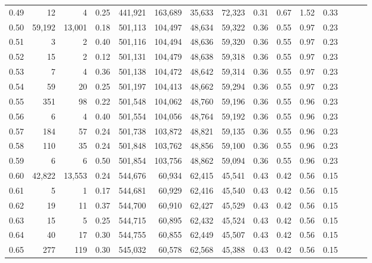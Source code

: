 \begin{tabular}{rrrrrrrrrrrrrrr}
0.49 &      12 &       4 &  0.25 &  441,921 &  163,689 &   35,633 &   72,323 &  0.31 &  0.67 &  1.52 &      0.33 \\
0.50 &  59,192 &  13,001 &  0.18 &  501,113 &  104,497 &   48,634 &   59,322 &  0.36 &  0.55 &  0.97 &      0.23 \\
0.51 &       3 &       2 &  0.40 &  501,116 &  104,494 &   48,636 &   59,320 &  0.36 &  0.55 &  0.97 &      0.23 \\
0.52 &      15 &       2 &  0.12 &  501,131 &  104,479 &   48,638 &   59,318 &  0.36 &  0.55 &  0.97 &      0.23 \\
0.53 &       7 &       4 &  0.36 &  501,138 &  104,472 &   48,642 &   59,314 &  0.36 &  0.55 &  0.97 &      0.23 \\
0.54 &      59 &      20 &  0.25 &  501,197 &  104,413 &   48,662 &   59,294 &  0.36 &  0.55 &  0.97 &      0.23 \\
0.55 &     351 &      98 &  0.22 &  501,548 &  104,062 &   48,760 &   59,196 &  0.36 &  0.55 &  0.96 &      0.23 \\
0.56 &       6 &       4 &  0.40 &  501,554 &  104,056 &   48,764 &   59,192 &  0.36 &  0.55 &  0.96 &      0.23 \\
0.57 &     184 &      57 &  0.24 &  501,738 &  103,872 &   48,821 &   59,135 &  0.36 &  0.55 &  0.96 &      0.23 \\
0.58 &     110 &      35 &  0.24 &  501,848 &  103,762 &   48,856 &   59,100 &  0.36 &  0.55 &  0.96 &      0.23 \\
0.59 &       6 &       6 &  0.50 &  501,854 &  103,756 &   48,862 &   59,094 &  0.36 &  0.55 &  0.96 &      0.23 \\
0.60 &  42,822 &  13,553 &  0.24 &  544,676 &   60,934 &   62,415 &   45,541 &  0.43 &  0.42 &  0.56 &      0.15 \\
0.61 &       5 &       1 &  0.17 &  544,681 &   60,929 &   62,416 &   45,540 &  0.43 &  0.42 &  0.56 &      0.15 \\
0.62 &      19 &      11 &  0.37 &  544,700 &   60,910 &   62,427 &   45,529 &  0.43 &  0.42 &  0.56 &      0.15 \\
0.63 &      15 &       5 &  0.25 &  544,715 &   60,895 &   62,432 &   45,524 &  0.43 &  0.42 &  0.56 &      0.15 \\
0.64 &      40 &      17 &  0.30 &  544,755 &   60,855 &   62,449 &   45,507 &  0.43 &  0.42 &  0.56 &      0.15 \\
0.65 &     277 &     119 &  0.30 &  545,032 &   60,578 &   62,568 &   45,388 &  0.43 &  0.42 &  0.56 &      0.15 \\

\end{tabular}
